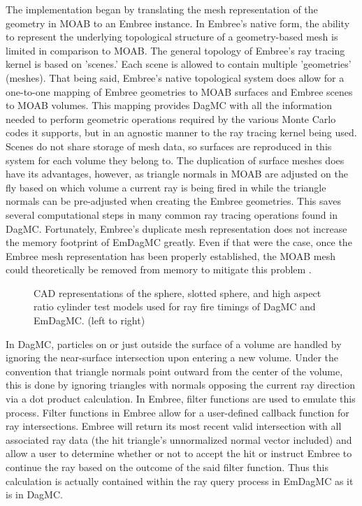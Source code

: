 \documentclass{anstrans}
\begin{document}
The implementation began by translating the mesh representation of the geometry in MOAB to an Embree instance. In Embree's native form, the ability to represent the underlying topological structure of a geometry-based mesh is limited in comparison to MOAB. The general topology of Embree's ray tracing kernel is based on 'scenes.'  Each scene is allowed to contain multiple 'geometries' (meshes). That being said, Embree's native topological system does allow for a one-to-one mapping of Embree geometries to MOAB surfaces and Embree scenes to MOAB volumes. This mapping provides DagMC with all the information needed to perform geometric operations required by the various Monte Carlo codes it supports, but in an agnostic manner to the ray tracing kernel being used. Scenes do not share storage of mesh data, so surfaces are reproduced in this system for each volume they belong to. The duplication of surface meshes does have its advantages, however, as triangle normals in MOAB are adjusted on the fly based on which volume a current ray is being fired in while the triangle normals can be pre-adjusted when creating the Embree geometries. This saves several computational steps in many common ray tracing operations found in DagMC. Fortunately, Embree's duplicate mesh representation does not increase the memory footprint of EmDagMC greatly. Even if that were the case, once the Embree mesh representation has been properly established, the MOAB mesh could theoretically be removed from memory to mitigate this problem
.
\begin{figure}

  \begin{center}

    \caption{CAD representations of the sphere, slotted sphere, and high aspect ratio cylinder test models used for ray fire timings of DagMC and EmDagMC. (left to right) \label{models}}

  \end{center}
\vspace{-0.3cm}

\end{figure} 

In DagMC, particles on or just outside the surface of a volume are handled by ignoring the near-surface intersection upon entering a new volume. Under the convention that triangle normals point outward from the center of the volume, this is done by ignoring triangles with normals opposing the current ray direction via a dot product calculation. In Embree, filter functions are used to emulate this process. Filter functions in Embree allow for a user-defined callback function for ray intersections. Embree will return its most recent valid intersection with all associated ray data (the hit triangle's unnormalized normal vector included) and allow a user to determine whether or not to accept the hit or instruct Embree to continue the ray based on the outcome of the said filter function. Thus this calculation is actually contained within the ray query process in EmDagMC as it is in DagMC.
\end{document}
